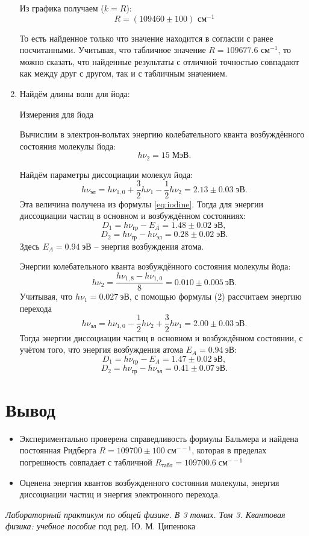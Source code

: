 \documentclass[12pt,a4paper]{article}
\begin{document}
\begin{enumerate}
	Из графика получаем ($k = R$):
	\begin{equation*}
		\boxed{R = (109460 \pm 100) \text{ см}^{-1}}
	\end{equation*}

	То есть найденное только что значение находится в согласии с ранее посчитанными.
	Учитывая, что табличное значение $R = 109677.6$ см$^{-1}$, то можно сказать, что найденные результаты с отличной точностью совпадают как между друг с другом, так и с табличным значением. 

    \item Найдём длины волн для йода:

     \begin{table}[h!]
       \centering
       \footnotesize
       
       \caption{Измерения для йода}
       \label{IodTable}
    \end{table}

	Вычислим в электрон-вольтах энергию колебательного кванта возбуждённого состояния молекулы йода:
	\[h\nu_2 = 15 \;\text{МэВ}.\]
	
	Найдём параметры диссоциации молекул йода:
	\[h\nu_{\text{эл}} = h\nu_{1, 0}+\dfrac{3}{2}h\nu_1 - \dfrac{1}{2}h\nu_2 = 2.13\pm 0.03\; \text{эВ}.\]
	Эта величина получена из формулы \eqref{eq:iodine}. Тогда для энергии диссоциации частиц в основном и возбуждённом состояниях:
	\[D_1 = h\nu_{\text{гр}} - E_A = 1.48\pm 0.02\; \text{эВ},\]
	\[D_2 = h\nu_{\text{гр}} - h\nu_{\text{эл}} = 0.28\pm 0.02\; \text{эВ}.\]
	Здесь $ E_A = 0.94\; \text{эВ}$ -- энергия возбуждения атома.


    Энергии колебательного кванта возбуждённого состояния молекулы йода:
    \[h\nu_{2} = \dfrac{h\nu_{1,8} - h\nu_{1,0}}{8} = 0.010 \pm 0.005~\text{эВ}.\]
    Учитывая, что $h\nu_1 = 0.027~\text{эВ}$, с помощью формулы (2) рассчитаем энергию перехода
    \[h\nu_{\text{эл}} = h\nu_{1,0} - \dfrac{1}{2} h\nu_2 + \dfrac{3}{2} h\nu_1 = 2.00 \pm 0.03~\text{эВ}.\]
    Тогда энергии диссоциации частиц в основном и возбуждённом состоянии, с учётом того, что энергия возбуждения атома $E_A = 0.94~\text{эВ}$:
    \[D_1 = h\nu_{\text{гр}} - E_A = 1.47 \pm 0.02~\text{эВ},\]
    \[D_2 = h\nu_{\text{гр}} - h\nu_{\text{эл}} = 0.41 \pm 0.07~\text{эВ}.\]

	\end{enumerate}

	\section*{Вывод}
    \begin{itemize}
        \item Экспериментально проверена справедливость формулы Бальмера и найдена постоянная Ридберга $R = 109700 \pm 100 \;
        \text{см}^{-−1} $, которая в пределах погрешность совпадает с табличной $ R_\text{табл} = 109700.6  \; \text{см}^{-−1} $
        \item Оценена энергия квантов возбужденного состояния молекулы, энергия диссоциации частиц и энергия электронного перехода.
    \end{itemize}

\newpage
\begin{thebibliography}{9}
	 \emph{Лабораторный практикум по общей физике. В 3 томах. Том 3. Квантовая физика: учебное пособие} под ред. Ю. М. Ципенюка
\end{thebibliography}
\end{document}
